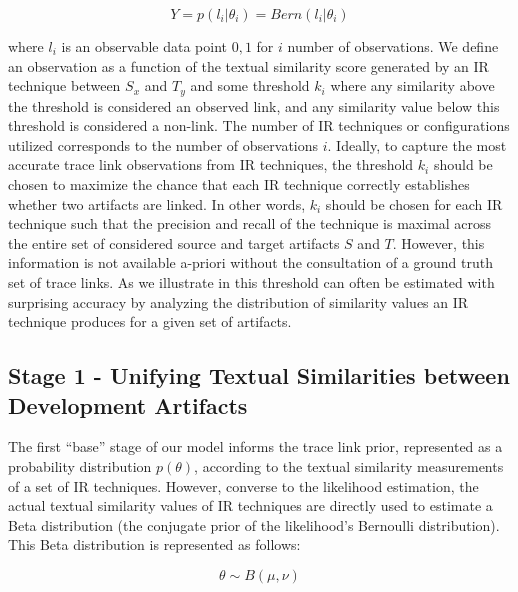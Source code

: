 \begin{equation}\label{eq:likelihood}
Y = p(l_i|\theta_i)= Bern(l_i|\theta_i)
\end{equation}

\noindent {} where $l_i$ is an observable data point ${0,1}$ for $i$ number of observations. We define an observation as a function of the textual similarity score generated by an IR technique between $S_x$ and $T_y$ and some threshold $k_i$ where any similarity above the threshold is considered an observed link, and any similarity value below this threshold is considered a non-link. The number of IR techniques or configurations utilized corresponds to the number of observations $i$.  Ideally, to capture the most accurate trace link observations from IR techniques, the threshold $k_i$ should be chosen to maximize the chance that each IR technique correctly establishes whether two artifacts are linked.  In other words, $k_i$ should be chosen for each IR technique such that the precision and recall of the technique is maximal across the entire set of considered source and target artifacts $S$ and $T$.  However, this information is not available a-priori without the consultation of a ground truth set of trace links. As we illustrate in  this threshold can often be estimated with surprising accuracy by analyzing the distribution of similarity values an IR technique produces for a given set of artifacts. 


\subsection{Stage 1 - Unifying Textual Similarities between Development Artifacts}
\label{sub:model-comp1}

The first ``base'' stage of our model informs the trace link prior, represented as a probability distribution $p(\theta)$, according to the textual similarity measurements of a set of IR techniques.  However, converse to the likelihood estimation, the actual textual similarity values of IR techniques are directly used to estimate a Beta distribution (the conjugate prior of the likelihood's Bernoulli distribution). This Beta distribution is represented as follows: 

\begin{equation}\label{eq:lvl1-dist}
\theta \sim B(\mu, \nu) 
\end{equation}

